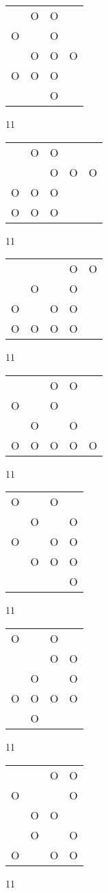 \begin{tabular}{|m{0.2cm}m{0.2cm}m{0.2cm}m{0.2cm}|}\hline
 &O&O& \\
O& &O& \\
 &O&O&O\\
O&O&O& \\
 & &O& \\
\hline\end{tabular}11
\begin{tabular}{|m{0.2cm}m{0.2cm}m{0.2cm}m{0.2cm}m{0.2cm}|}\hline
 &O&O& & \\
 & &O&O&O\\
O&O&O& & \\
O&O&O& & \\
\hline\end{tabular}11
\begin{tabular}{|m{0.2cm}m{0.2cm}m{0.2cm}m{0.2cm}m{0.2cm}|}\hline
 & & &O&O\\
 &O& &O& \\
O& &O&O& \\
O&O&O&O& \\
\hline\end{tabular}11
\begin{tabular}{|m{0.2cm}m{0.2cm}m{0.2cm}m{0.2cm}m{0.2cm}|}\hline
 & &O&O& \\
O& &O& & \\
 &O& &O& \\
O&O&O&O&O\\
\hline\end{tabular}11
\begin{tabular}{|m{0.2cm}m{0.2cm}m{0.2cm}m{0.2cm}|}\hline
O& &O& \\
 &O& &O\\
O& &O&O\\
 &O&O&O\\
 & & &O\\
\hline\end{tabular}11
\begin{tabular}{|m{0.2cm}m{0.2cm}m{0.2cm}m{0.2cm}|}\hline
O& &O& \\
 & &O&O\\
 &O& &O\\
O&O&O&O\\
 &O& & \\
\hline\end{tabular}11
\begin{tabular}{|m{0.2cm}m{0.2cm}m{0.2cm}m{0.2cm}|}\hline
 & &O&O\\
O& & &O\\
 &O&O& \\
 &O& &O\\
O& &O&O\\
\hline\end{tabular}11
